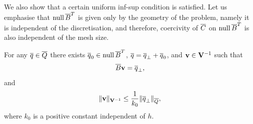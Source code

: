 We also show that a certain uniform inf-sup condition is satisfied.
Let us emphasise that $\text{null}\,\overline{B}^T$ is given only by the geometry of 
the problem, namely it is independent of the discretisation, and therefore, 
coercivity of $\overline{C}$ on $\mbox{null}\,\overline{B}^T$ is also independent of the mesh size.

\begin{theorem}
\label{th:infsup}
For any $\overline{q}\in\overline{Q}$ there exists $\overline{q}_0\in \mbox{null}\,\overline{B}^T$, 
$\overline{q} =\overline{q}_{\bot} + \overline{q}_0$, and $\mathbf{v}\in \mathbf{V}^{-1}$ such that 
\begin{equation}
\label{eq:infsup_relation}
 \overline{B}\mathbf{v}=\overline{q}_{\bot},
\end{equation} 
and
\begin{equation}
   \label{eg:infsup_estimate}
 \|\mathbf{v}\|_{\mathbf{V}^{-1}} \le \frac{1}{k_0} \|\overline{q}_{\bot}\|_{\overline{Q}},
\end{equation}
where $k_0$ is a positive constant independent of $h$. 
\end{theorem}

